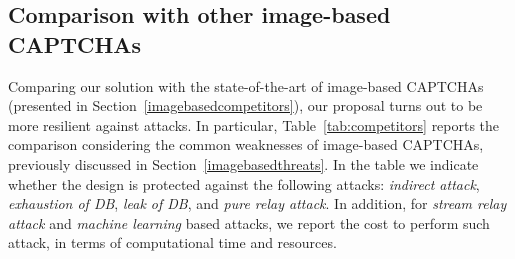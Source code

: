 \documentclass[conference]{IEEEtran}
\begin{document}
\subsection{Comparison with other image-based CAPTCHAs }
\label{comparison}
Comparing our solution with the state-of-the-art of image-based CAPTCHAs (presented in Section~\ref{imagebasedcompetitors}), our proposal turns out to be more resilient against attacks. In particular, Table~\ref{tab:competitors} reports the comparison considering the common weaknesses of image-based CAPTCHAs, previously discussed in Section~\ref{imagebasedthreats}.
In the table we indicate whether the design is protected against the following attacks: \textit{indirect attack}, \textit{exhaustion of DB}, \textit{leak of DB}, and \textit{pure relay attack}.
In addition, for \textit{stream relay attack} and \textit{machine learning} based attacks, we report the cost to perform such attack, in terms of computational time and resources.
\end{document}
